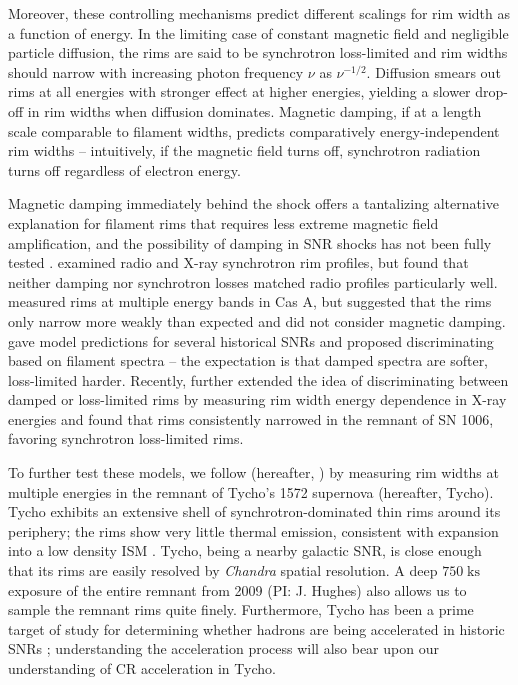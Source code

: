 \documentclass[iop, apj, numberedappendix, twocolappendix]{emulateapj}
\newcommand*{\mt}{\mathrm}
\newcommand*{\unit}[1]{\;\mt{#1}}  %
\begin{document}
Moreover, these controlling mechanisms predict different scalings for rim width
as a function of energy.  In the limiting case of constant magnetic field and
negligible particle diffusion, the rims are said to be synchrotron loss-limited
and rim widths should narrow with increasing photon frequency $\nu$ as
$\nu^{-1/2}$. Diffusion smears out rims at all energies with stronger effect at
higher energies, yielding a slower drop-off in rim widths when diffusion
dominates.  Magnetic damping, if at a length scale comparable to filament
widths, predicts comparatively energy-independent rim widths -- intuitively, if
the magnetic field turns off, synchrotron radiation turns off regardless of
electron energy.

Magnetic damping immediately behind the shock offers a tantalizing alternative
explanation for filament rims that requires less extreme magnetic field
amplification, and the possibility of damping in SNR shocks has not been fully
tested \citep{pohl2005, marcowith2010}.  \citet{cassam-chenai2007} examined
radio and X-ray synchrotron rim profiles, but found that neither damping nor
synchrotron losses matched radio profiles particularly well.  \citet{araya2010}
measured rims at multiple energy bands in Cas A, but suggested that the rims
only narrow more weakly than expected and did not consider magnetic damping.
\citet{rettig2012} gave model predictions for several historical SNRs and
proposed discriminating based on filament spectra -- the expectation is that
damped spectra are softer, loss-limited harder.  Recently, \citet{ressler2014}
further extended the idea of discriminating between damped or loss-limited
rims by measuring rim width energy dependence in X-ray energies and found that
rims consistently narrowed in the remnant of SN 1006, favoring synchrotron
loss-limited rims.

To further test these models, we follow \citet{ressler2014} (hereafter,
) by measuring rim widths at multiple energies in the
remnant of Tycho's 1572 supernova (hereafter, Tycho).  Tycho exhibits an
extensive shell of synchrotron-dominated thin rims around its periphery; the
rims show very little thermal emission, consistent with expansion into a low
density ISM \citet{williams2013}.  Tycho, being a nearby galactic SNR, is close
enough that its rims are easily resolved by \textit{Chandra} spatial
resolution. A deep $750 \unit{ks}$ exposure of the entire remnant from 2009
(PI: J. Hughes) also allows us to sample the remnant rims quite finely.
Furthermore, Tycho has been a prime target of study for determining whether
hadrons are being accelerated in historic SNRs \citep[and references
therein]{morlino2012}; understanding the acceleration process will also bear
upon our understanding of CR acceleration in Tycho.
\end{document}
